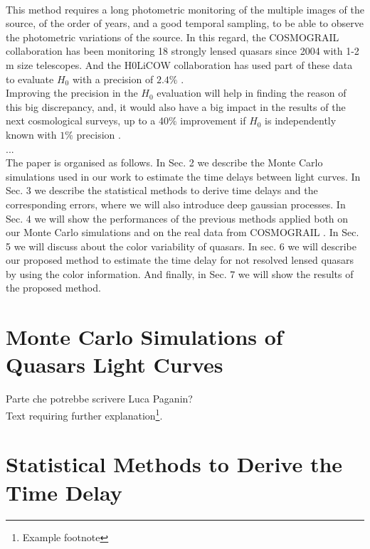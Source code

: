 \documentclass[twoside,twocolumn]{article}
\begin{document}
\\
This method requires a long photometric monitoring of the multiple images of the source, of the order of years, and a good temporal sampling, to be able to observe the photometric variations of the source. In this regard, the COSMOGRAIL collaboration has been monitoring 18 strongly lensed quasars since 2004 \cite{cosmograil} with 1-2 m size telescopes. And the H0LiCOW collaboration has used part of these data to evaluate $H_0$ with a precision of $2.4\%$ \cite{h0licow_XIII}. 
\\
Improving the precision in the $H_0$ evaluation will help in finding the reason of this big discrepancy, and, it would also have a big impact in the results of the next cosmological surveys, up to a 40$\%$ improvement if $H_0$ is independently known with $1\%$ precision \cite{weinberg_euclid}.
\\
...
\\
The paper is organised as follows. In Sec. 2 we describe the Monte Carlo simulations used in our work to estimate the time delays between light curves. In Sec. 3 we describe the statistical methods to derive time delays and the corresponding errors, where we will also introduce deep gaussian processes. In Sec. 4 we will show the performances of the previous methods applied both on our Monte Carlo simulations and on the real data from COSMOGRAIL \cite{cosmograil}. In Sec. 5 we will discuss about the color variability of quasars. In sec. 6 we will describe our proposed method to estimate the time delay for not resolved lensed quasars by using the color information. And finally, in Sec. 7 we will show the results of the proposed method.



\section{Monte Carlo Simulations of Quasars Light Curves}

Parte che potrebbe scrivere Luca Paganin?
\\
Text requiring further explanation\footnote{Example footnote}.


\section{Statistical Methods to Derive the Time Delay}
\end{document}
